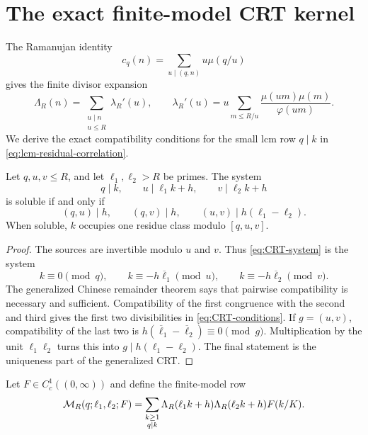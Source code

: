 \section{The exact finite-model CRT kernel}
\label{sec:crt}

The Ramanujan identity
\[
 c_q(n)=\sum_{u\mid(q,n)}u\mu(q/u)
\]
gives the finite divisor expansion
\begin{equation}
 \Lambda_R(n)=\sum_{\substack{u\mid n\\u\le R}}\lambda_R'(u),
 \qquad
 \lambda_R'(u)=u\sum_{m\le R/u}
 \frac{\mu(um)\mu(m)}{\varphi(um)}.
 \label{eq:lambda-prime-R}
\end{equation}
We derive the exact compatibility conditions for the small lcm row
$q\mid k$ in \eqref{eq:lcm-residual-correlation}.

\begin{lemma}
\label{lem:CRT-compatibility}
Let $q,u,v\le R$, and let $\ell_1,\ell_2>R$ be primes.  The system
\begin{equation}
 q\mid k,\qquad
 u\mid\ell_1k+h,\qquad
 v\mid\ell_2k+h
 \label{eq:CRT-system}
\end{equation}
is soluble if and only if
\begin{equation}
 \boxed{\quad
 (q,u)\mid h,\qquad
 (q,v)\mid h,\qquad
 (u,v)\mid h(\ell_1-\ell_2).
 \quad}
 \label{eq:CRT-conditions}
\end{equation}
When soluble, $k$ occupies one residue class modulo $[q,u,v]$.
\end{lemma}

\begin{proof}
The sources are invertible modulo $u$ and $v$.  Thus
\eqref{eq:CRT-system} is the system
\[
 k\equiv0\pmod q,\qquad
 k\equiv-h\overline\ell_1\pmod u,\qquad
 k\equiv-h\overline\ell_2\pmod v.
\]
The generalized Chinese remainder theorem says that pairwise
compatibility is necessary and sufficient.  Compatibility of the first
congruence with the second and third gives the first two divisibilities
in \eqref{eq:CRT-conditions}.  If $g=(u,v)$, compatibility of the last
two is
$h(\overline\ell_1-\overline\ell_2)\equiv0\pmod g$.
Multiplication by the unit $\ell_1\ell_2$ turns this into
$g\mid h(\ell_1-\ell_2)$.  The final statement is the uniqueness part
of the generalized CRT.
\end{proof}

Let $F\in C_c^1((0,\infty))$ and define the finite-model row
\begin{equation}
 \mathcal M_R(q;\ell_1,\ell_2;F)
 =\sum_{\substack{k\ge1\\q\mid k}}
 \Lambda_R(\ell_1k+h)\Lambda_R(\ell_2k+h)F(k/K).
 \label{eq:finite-model-row}
\end{equation}


